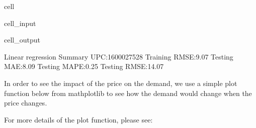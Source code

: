 \documentclass[letterpaper,10pt,english]{jupyterBook}
\begin{document}
\begin{sphinxuseclass}{cell}
\begin{sphinxVerbatimInput}
\begin{sphinxuseclass}{cell_input}
\begin{sphinxVerbatim}[commandchars=\\\{\}]
  
  
  
  
\end{sphinxVerbatim}

\end{sphinxuseclass}\end{sphinxVerbatimInput}
\begin{sphinxVerbatimOutput}

\begin{sphinxuseclass}{cell_output}
\begin{sphinxVerbatim}[commandchars=\\\{\}]
Linear regression Summary \PYGZhy{} UPC:1600027528
Training RMSE:9.07
Testing MAE:8.09
Testing MAPE:0.25
Testing RMSE:14.07
\end{sphinxVerbatim}

\end{sphinxuseclass}\end{sphinxVerbatimOutput}

\end{sphinxuseclass}
\sphinxAtStartPar
In order to see the impact of the price on the demand, we use a simple plot function below from mathplotlib to see how the demand would change when the price changes.

\sphinxAtStartPar
For more details of the plot function, please see: 
\end{document}
